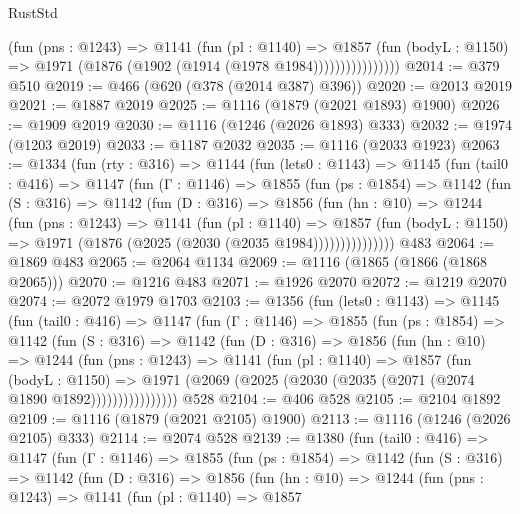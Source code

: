 \begin{lexlean}{RustStd}
\begin{coremodule}
{\begin{coremodule}
{{{{{{{{{{{                      (fun (pns : @1243) =>
                      @1141
                        (fun (pl : @1140) =>
                        @1857
                          (fun (bodyL : @1150) =>
                          @1971 (@1876 (@1902 (@1914 (@1978 @1984))))))))))))))))
@2014 := @379 @510
@2019 := @466 (@620 (@378 (@2014 @387) @396))
@2020 := @2013 @2019
@2021 := @1887 @2019
@2025 := @1116 (@1879 (@2021 @1893) @1900)
@2026 := @1909 @2019
@2030 := @1116 (@1246 (@2026 @1893) @333)
@2032 := @1974 (@1203 @2019)
@2033 := @1187 @2032
@2035 := @1116 (@2033 @1923)
@2063 := @1334
    (fun (rty : @316) =>
    @1144
      (fun (lets0 : @1143) =>
      @1145
        (fun (tail0 : @416) =>
        @1147
          (fun (Γ : @1146) =>
          @1855
            (fun (ps : @1854) =>
            @1142
              (fun (S : @316) =>
              @1142
                (fun (D : @316) =>
                @1856
                  (fun (hn : @10) =>
                  @1244
                    (fun (pns : @1243) =>
                    @1141
                      (fun (pl : @1140) =>
                      @1857
                        (fun (bodyL : @1150) =>
                        @1971 (@1876 (@2025 (@2030 (@2035 @1984)))))))))))))))
    @483
@2064 := @1869 @483
@2065 := @2064 @1134
@2069 := @1116 (@1865 (@1866 (@1868 @2065)))
@2070 := @1216 @483
@2071 := @1926 @2070
@2072 := @1219 @2070
@2074 := @2072 @1979 @1703
@2103 := @1356
    (fun (lets0 : @1143) =>
    @1145
      (fun (tail0 : @416) =>
      @1147
        (fun (Γ : @1146) =>
        @1855
          (fun (ps : @1854) =>
          @1142
            (fun (S : @316) =>
            @1142
              (fun (D : @316) =>
              @1856
                (fun (hn : @10) =>
                @1244
                  (fun (pns : @1243) =>
                  @1141
                    (fun (pl : @1140) =>
                    @1857
                      (fun (bodyL : @1150) =>
                      @1971 (@2069 (@2025 (@2030 (@2035 (@2071 (@2074 @1890 @1892))))))))))))))))
    @528
@2104 := @406 @528
@2105 := @2104 @1892
@2109 := @1116 (@1879 (@2021 @2105) @1900)
@2113 := @1116 (@1246 (@2026 @2105) @333)
@2114 := @2074 @528
@2139 := @1380
    (fun (tail0 : @416) =>
    @1147
      (fun (Γ : @1146) =>
      @1855
        (fun (ps : @1854) =>
        @1142
          (fun (S : @316) =>
          @1142
            (fun (D : @316) =>
            @1856
              (fun (hn : @10) =>
              @1244
                (fun (pns : @1243) =>
                @1141
                  (fun (pl : @1140) =>
                  @1857
}}}}}}}}}}}
\end{coremodule}}
\end{coremodule}
\end{lexlean}
